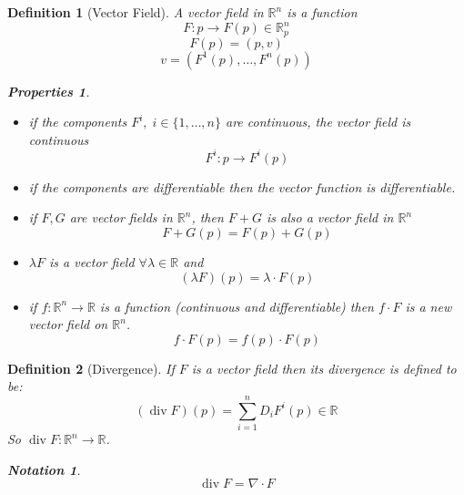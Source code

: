 \documentclass[12pt]{article}
\def\RR{\mathbb{R}}
\DeclareMathOperator{\dive}{div}
\newtheorem{definition}{Definition}[section]
\newtheorem*{properties}{Properties}
\newtheorem*{notation}{Notation}
\begin{document}
\begin{definition}[Vector Field]
A vector field in $\RR^n$ is a function
\[F:p \rightarrow F(p)\in \RR_p^n\]
\[F(p) = (p,v)\]
\[v=(F^1(p), \dots , F^n(p))\]
\begin{properties} \quad \\
\begin{itemize}
\item if the components $F^i, \; i \in \{1, \dots, n\}$ are continuous, the vector field is continuous
\[F^i:p\rightarrow F^i(p)\]
\item if the components are differentiable then the vector function is differentiable.
\item if $F,G$ are vector fields in $\RR^n$, then $F+G$ is also a vector field in $\RR^n$
\[F+G(p) = F(p) + G(p)\]
\item $\lambda F$ is a vector field $\forall \lambda \in \RR$ and 
\[ (\lambda F)(p) = \lambda \cdot F(p)\]
\item if $f:\RR^n \rightarrow \RR$ is a function (continuous and differentiable) then $f\cdot F$ is a new vector field on $\RR^n$.
\[f\cdot F(p) = f(p)\cdot F(p)\]
\end{itemize}
\end{properties}
\end{definition}

\begin{definition}[Divergence]
If $F$ is a vector field then its divergence is defined to be:
\[(\dive F )(p) = \sum\limits_{i=1}^{n}D_iF^i(p) \in \RR\]
So $\dive F : \RR^n \rightarrow  \RR$. 
\begin{notation} \[\dive F = \nabla \cdot F\] \end{notation}
\end{definition}
\end{document}
